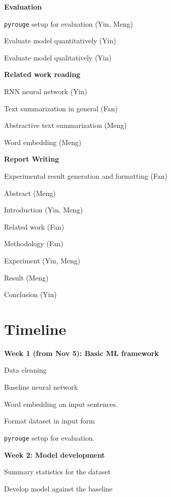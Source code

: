 \noindent
\textbf{Evaluation}
\begin{compactitem}
\item \texttt{pyrouge} setup for evaluation (Yin, Meng)
\item Evaluate model quantitatively (Yin)
\item Evaluate model qualitatively (Yin)
\end{compactitem}

\noindent
\textbf{Related work reading}
\begin{compactitem}
\item RNN neural network (Yin)
\item Text summarization in general (Fan)
\item Abstractive text summarization (Meng)
\item Word embedding (Meng)
\end{compactitem}

\noindent
\textbf{Report Writing}
\begin{compactitem}
\item Experimental result generation and formatting (Fan)
\item Abstract (Meng)
\item Introduction (Yin, Meng)
\item Related work (Fan)
\item Methodology (Fan)
\item Experiment (Yin, Meng)
\item Result (Meng)
\item Conclusion (Yin)
\end{compactitem}


\section{Timeline}

\noindent
\textbf{Week 1 (from Nov 5): Basic ML framework}
\begin{compactitem}
\item Data cleaning 
\item Baseline neural network 
\item Word embedding on input sentences.
\item Format dataset in input form 
\item \texttt{pyrouge} setup for evaluation.
\end{compactitem}

\noindent
\textbf{Week 2: Model development}
\begin{compactitem}
\item Summary statistics for the dataset
\item Develop model against the baseline
\end{compactitem}

